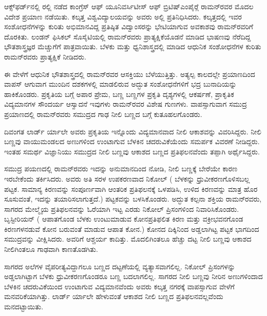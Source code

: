 
ಆಕ್ಸ್‌ಫರ್ಡ್‌ನಲ್ಲಿ ರಲ್ಲಿ ನಡೆದ ಕಾಂಗ್ರೆಸ್ ಆಫ್ ಯೂನಿವರ್ಸಿಟೀಸ್ ಆಫ್ ಬ್ರಿಟಿಷ್\break ಎಂಪೈರ್‍ಗೆ ರಾಮನ್‍ರವರ ಮೊದಲ ವಿದೇಶ ಪ್ರಯಾಣ ನಡೆಯಿತು. ಕಲ್ಕತ್ತ ವಿಶ್ವವಿದ್ಯಾಲಯವನ್ನು ಅವರು ಅಲ್ಲಿ ಪ್ರತಿನಿಧಿಸಿದರು. ಕಲ್ಕತ್ತದಲ್ಲಿ ಇವರ ಸಂಶೋಧನೆಗಳನ್ನು ಕುರಿತು ಅಭಿಮಾನವಿದ್ದ ಪ್ರತಿಷ್ಠಿತ ವಿದ್ವಾಂಸರನ್ನು ಭೇಟಿಯಾಗುವ ಅವಕಾಶವು ರಾಮನ್‍ರವರಿಗೆ ದೊರಕಿತು. ಲಂಡನ್ ಫಿಸಿಕಲ್ ಸೊಸೈಟಿಯಲ್ಲಿ ರಾಮನ್‍ರವರು ಪ್ರಾತ್ಯಕ್ಷಿಕೆಯೊಡನೆ ಮಾಡಿದ ಭಾಷಣವು ನೆರೆದಿದ್ದ ಭೌತಶಾಸ್ತ್ರಜ್ಞರ ಮೆಚ್ಚುಗೆಗೆ ಪಾತ್ರವಾಯಿತು. ಬೆಳಕು ಮತ್ತು ಧ್ವನಿಶಾಸ್ತ್ರದಲ್ಲಿ ಮಾಡಿದ ಆಧುನಿಕ ಸಂಶೋ\-ಧನೆಗಳ ಕುರಿತು ರಾಮನ್‍ರವರು ಪ್ರಾತ್ಯಕ್ಷಿಕೆ ನೀಡಿದರು.

ಈ ವೇಳೆಗೆ ಆಧುನಿಕ ಭೌತಶಾಸ್ತ್ರದಲ್ಲಿ ರಾಮನ್‍ರವರ ಆಸಕ್ತಿಯು ಬೆಳೆಯುತ್ತಿತ್ತು. ಅತ್ಯಲ್ಪ ಕಾಲದಲ್ಲೇ ಪ್ರಯಾಣದಿಂದ ವಾಪಸ್ ಆಗುವಾಗ ಮುಂದಿನ ದಶಕಗಳಲ್ಲಿ ಮಾಡಲಿರುವ ಅದ್ಭುತ ಸಂಶೋಧನೆಗಳಿಗೆ ಭದ್ರ ಬುನಾದಿಯನ್ನು ಹಾಕಿಕೊಂಡರು. ಪ್ರಕೃತಿಯ ಬಗ್ಗೆ ಅಪಾರ ಪ್ರೇಮ, ಬಣ್ಣ ಬಣ್ಣಗಳ ಪ್ರಕೃತಿ ದೃಶ್ಯಗಳಲ್ಲಿ ಆಕರ್ಷಣೆ, ಪ್ರಾಕೃತಿಕ ವಿದ್ಯಮಾನಗಳ ಸೌಂದರ್ಯ ಆಸ್ವಾದನೆ \enginline{-} ಇವುಗಳು ರಾಮನ್‍ರವರ ವಿಶೇಷ ಗುಣಗಳು. ವಾಪಸ್ಸಾಗುವಾಗ ಸಮುದ್ರ ಪ್ರಯಾಣದಲ್ಲಿ ರಾಮನ್‍ರವರು ಸಮುದ್ರದ ಗಾಢ ನೀಲಿ ಬಣ್ಣದ ಬಗ್ಗೆ ಕುತೂಹಲಗೊಂಡರು.

ದಿವಂಗತ ಲಾರ್ಡ್ ರ್ಯಾಲೇ ಅವರು ಪ್ರಕೃತಿಯ ಇನ್ನೊಂದು ವಿದ್ಯಮಾನವಾದ ನೀಲಿ ಆಕಾಶವನ್ನು ವಿವರಿಸಿದ್ದರು. ನೀಲಿ ಬಣ್ಣವು ವಾಯುಮಂಡಲದ ಅಣುಗಳಿಂದ ಉಂಟಾಗುವ ಬೆಳಕಿನ ಚದರುವಿಕೆಯೆಂದು ಸಮರ್ಪಕ ವಿವರಣೆ ನೀಡಿದ್ದರು. ಇಂತಹ ಸಮರ್ಥ ವಿಜ್ಞಾನಿಯು ಸಮುದ್ರದ ನೀಲಿ ಬಣ್ಣವು ಆಕಾಶದ ಬಣ್ಣದ ಪ್ರತಿಫಲನವೆಂದು ತಪ್ಪಾಗಿ ಅರ್ಥೈಸಿದ್ದರು.

ಸಮುದ್ರ ಪಯಣದಲ್ಲಿ ರಾಮನ್‍ರವರು ಇದನ್ನು ಅನುಮಾನದಿಂದ ನೋಡಿ, ನೀಲಿ ಬಣ್ಣಕ್ಕೆ ಬೇರೆಯೇ ಕಾರಣ ಇರಬೇಕೆಂದು ತರ್ಕಿಸಿದರು. ಅವರು ಅತಿ ಸರಳ ಉಪಕರಣವಾದ ನಿಕೋಲ್ ( ಬೆಳಕನ್ನು ಧ್ರುವೀಕರಣಗೊಳಿಸಬಲ್ಲ ಪಟ್ಟಕ. ಸಾಮಾನ್ಯ ಕಿರಣವನ್ನು ಸಂಪೂರ್ಣವಾಗಿ ಆಂತರಿಕ ಪ್ರತಿಫಲನಕ್ಕೆ ಒಳಪಡಿಸಿ, ಉಳಿದ ಕಿರಣವನ್ನು ಮಾತ್ರ ಹೊರ ಸೂಸುವಂತೆ, ಇದನ್ನು ತಯಾರಿಸಲಾಗುತ್ತದೆ.) ಪಟ್ಟಕವನ್ನು ಬಳಸಿಕೊಂಡರು. ಅದ್ಭುತ ಕಲ್ಪನಾ ಶಕ್ತಿಯ ರಾಮನ್‍ರವರು, ಸಾಗರದ ಮೇಲ್ಮೈಯ ಪ್ರತಿಫಲನವನ್ನು ಓರೆಯಾಗಿ ಇಟ್ಟ ಎರಡು ನಿಕೋಲ್ ಪ್ರಿಸಂಗಳಿಂದ ನಿವಾರಿಸಿಕೊಂಡರು. ಬೃಸ್ಟೀರಿಯನ್ ( ಆಪಾತಗೊಂಡ ಬೆಳಕು ಉಂಟುಮಾಡುವ ಕೋನ\enginline{-}ಪ್ರತಿಫಲಿತ ಕಿರಣ ಮತ್ತು ವಕ್ರೀಭವನಗೊಂಡ ಕಿರಣಗಳನಡುವೆ ಕೋನ ಬರುವಂತೆ ಮಾಡುವ ಆಪಾತ ಕೋನ.) ಕೋನದ ದಿಕ್ಕಿನಿಂದ ಅಡ್ಡಲಾಗಿಟ್ಟ ಪಟ್ಟಕ ಭಾಗದಿಂದ ಸಮುದ್ರವನ್ನು ವೀಕ್ಷಿಸಿದರು. ಅವರಿಗೆ ಆಶ್ಚರ್ಯ ಕಾದಿತ್ತು. ಮೊದಲಿಗಿಂತಲೂ ಹೆಚ್ಚು ದಟ್ಟ ನೀಲಿ ಬಣ್ಣವು ಆಕಾಶದ ನೀಲಿಗಿಂತಲೂ ಗಾಢವಾಗಿ ಕಾಣತೊಡಗಿತು. 

ಸಾಗರದ ಅಲೆಗಳ ವೈಪರೀತ್ಯವಿದ್ದಾಗಲೂ ಬಣ್ಣದ ದಟ್ಟಣೆಯಲ್ಲಿ ವ್ಯತ್ಯಾಸವಾಗಲಿಲ್ಲ. ನಿಕೋಲ್ ಪ್ರಿಸಂಗಳನ್ನು ಅಡ್ಡಲಾಗಿಟ್ಟಾಗ ಬೆಳಕು ಧ್ರುವೀಕರಣಗೊಂಡರೂ ಬಣ್ಣ ಬದಲಾಗಲಿಲ್ಲ. ಸಾಗರದ ನೀಲಿ ಬಣ್ಣವು ನೀರಿನ ಅಣುಗಳಿಂದಾದ ಬೆಳಕಿನ ಚದರುವಿಕೆಯಿಂದ ಉಂಟಾಗುವ ವಿದ್ಯಮಾನವೆಂದು ಅವರು ಕಲ್ಕತ್ತ ನಗರಕ್ಕೆ ವಾಪಸ್ಸಾಗುವ ವೇಳೆಗೆ ಮನವರಿಕೆಯಾಗಿತ್ತು. ಲಾರ್ಡ್ ರ್ಯಾಲೇ ಹೇಳುವಂತೆ ಆಕಾಶದ ನೀಲಿ ಬಣ್ಣದ ಪ್ರತಿಫಲನವಲ್ಲವೆಂದು ಮನದಟ್ಟಾಯಿತು.

